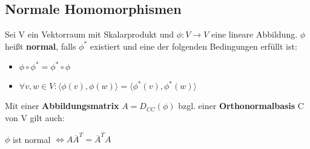 \documentclass[10pt,a4paper]{article}
\begin{document}
	\subsection{Normale Homomorphismen}
	Sei V ein Vektorraum mit Skalarprodukt und $\phi: V \rightarrow V$ eine lineare Abbildung. $\phi$ heißt \textbf{normal}, falls $\phi^*$ existiert und eine der folgenden Bedingungen erfüllt ist:
	\begin{itemize}
		\item $\phi \circ \phi^* = \phi^* \circ \phi$
		\item $\forall v,w \in V: \langle \phi(v), \phi(w)\rangle = \langle \phi^*(v), \phi^*(w)\rangle$
	\end{itemize}
	Mit einer \textbf{Abbildungsmatrix} $A = D_{CC}(\phi)$ bzgl. einer \textbf{Orthonormalbasis} C von V gilt auch:
	\begin{center}
		$\phi$ ist normal $\Leftrightarrow A \overline{A}^T = \overline{A}^TA$
	\end{center}
\end{document}
